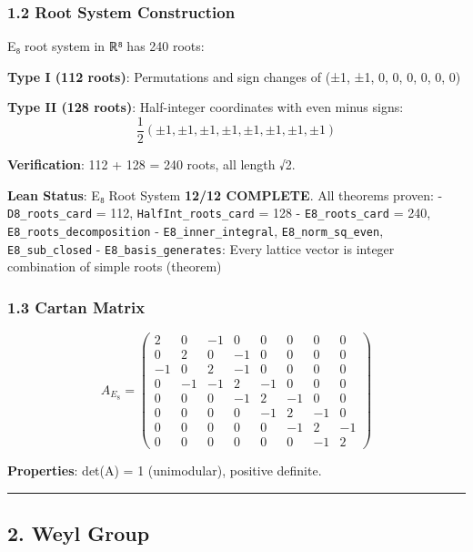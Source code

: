 \documentclass[11pt,a4paper]{article}
\begin{document}
{{{\subsubsection{1.2 Root System Construction}\label{root-system-construction}

E₈ root system in ℝ⁸ has 240 roots:

\textbf{Type I (112 roots)}: Permutations and sign changes of (±1, ±1, 0, 0, 0, 0, 0, 0)

\textbf{Type II (128 roots)}: Half-integer coordinates with even minus signs:
\[\frac{1}{2}(\pm 1, \pm 1, \pm 1, \pm 1, \pm 1, \pm 1, \pm 1, \pm 1)\]

\textbf{Verification}: 112 + 128 = 240 roots, all length √2.

\textbf{Lean Status}: E₈ Root System \textbf{12/12 COMPLETE}. All theorems proven:
- \texttt{D8\_roots\_card} = 112, \texttt{HalfInt\_roots\_card} = 128
- \texttt{E8\_roots\_card} = 240, \texttt{E8\_roots\_decomposition}
- \texttt{E8\_inner\_integral}, \texttt{E8\_norm\_sq\_even}, \texttt{E8\_sub\_closed}
- \texttt{E8\_basis\_generates}: Every lattice vector is integer combination of simple roots (theorem)

\subsubsection{1.3 Cartan Matrix}\label{cartan-matrix}

\[A_{E_8} = \begin{pmatrix}
2 & 0 & -1 & 0 & 0 & 0 & 0 & 0 \\
0 & 2 & 0 & -1 & 0 & 0 & 0 & 0 \\
-1 & 0 & 2 & -1 & 0 & 0 & 0 & 0 \\
0 & -1 & -1 & 2 & -1 & 0 & 0 & 0 \\
0 & 0 & 0 & -1 & 2 & -1 & 0 & 0 \\
0 & 0 & 0 & 0 & -1 & 2 & -1 & 0 \\
0 & 0 & 0 & 0 & 0 & -1 & 2 & -1 \\
0 & 0 & 0 & 0 & 0 & 0 & -1 & 2
\end{pmatrix}\]

\textbf{Properties}: det(A) = 1 (unimodular), positive definite.

\begin{center}\rule{0.5\linewidth}{0.5pt}\end{center}

\subsection{2. Weyl Group}\label{weyl-group}

}}}
\end{document}
